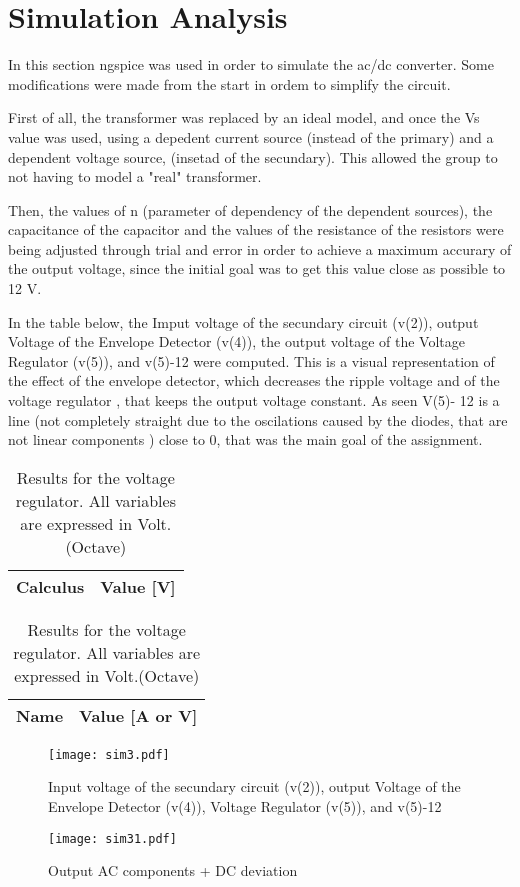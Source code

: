 \section{Simulation Analysis}\label{section:sim}
 In this section ngspice was used in order to simulate the ac/dc converter. Some modifications were made from the start in ordem to simplify the circuit.
 
 First of all, the transformer was replaced by an ideal model, and once the Vs value was used, using a depedent current source (instead of the primary) and a dependent voltage source, (insetad of the secundary). This allowed the group to not having to model a "real" transformer. 
 
Then, the values of n (parameter of dependency of the dependent sources), the capacitance of the capacitor and the values of the resistance of the resistors were being adjusted through trial and error in order to achieve a maximum accurary of the output voltage, since the initial goal was to get this value close as possible to 12 V.


In the table below, the Imput voltage of the secundary circuit (v(2)), output Voltage of the Envelope Detector (v(4)), the output voltage of the  Voltage Regulator (v(5)), and v(5)-12 were computed. This is a visual representation of the effect of the envelope detector, which decreases the ripple voltage and of the voltage regulator , that keeps the output voltage constant. As seen V(5)- 12 is a line (not completely straight due to the oscilations caused by the diodes, that are not linear components ) close to 0, that was the main goal of the assignment.



\begin{table}[ht]
\parbox{.45\linewidth}{
  \centering
  \begin{tabular}{|l|r|}
    \hline    
    {\bf Calculus} & {\bf Value [V]} \\ \hline
    
  \end{tabular}
  \caption{Results for the voltage regulator. All variables are expressed in Volt. (Ngspice)}} 
\parbox{.45\linewidth}{
  \centering
  \begin{tabular}{|l|r|}
    \hline    
    {\bf Name} & {\bf Value [A or V]} \\ \hline
    
  \end{tabular}
  \caption{Results for the voltage regulator. All variables are expressed in Volt.(Octave)}}
\end{table}




\begin{figure}[h] \centering
\texttt{[image: sim3.pdf]}
\caption{Input voltage of the secundary circuit (v(2)), output Voltage of the Envelope Detector (v(4)), Voltage Regulator (v(5)), and v(5)-12}
\label{fig:sim5}
\end{figure}


\begin{figure}[h] \centering
\texttt{[image: sim31.pdf]}
\caption{Output AC components + DC deviation}
\label{fig:sim5}
\end{figure}


